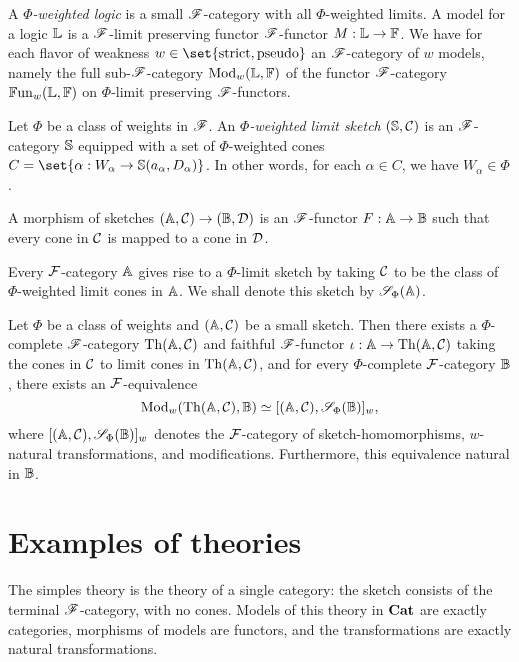 \documentclass[../thesis.tex]{subfiles}
\begin{document}
  \begin{definition}[Logic]
    A \emph{$\Phi$-weighted logic} is a small ${\mathscr{F}}$-category with all $\Phi$-weighted limits. A model for a
    logic ${\mathbb{L}}$ is a ${\mathscr{F}}$-limit preserving functor ${\mathscr{F}}$-functor $M : {\mathbb{L}} \to {\mathbb{F}}$. We have for each flavor 
    of weakness $w \in \set{\text{strict}, \text{pseudo}}$ an ${\mathscr{F}}$-category of $w$ models, namely the full
    sub-${\mathscr{F}}$-category ${\mathrm{Mod}}_w({\mathbb{L}}, {\mathbb{F}})$ of the functor ${\mathscr{F}}$-category ${\mathbb{F}\mathrm{un}}_w({\mathbb{L}},{\mathbb{F}})$ on $\Phi$-limit
    preserving ${\mathscr{F}}$-functors.
  \end{definition}

  \begin{definition}
    Let $\Phi$ be a class of weights in ${\mathscr{F}}$. An \emph{$\Phi$-weighted limit sketch} $({\mathbb{S}},{\mathcal{C}})$ is an
    ${\mathscr{F}}$-category ${\mathbb{S}}$ equipped with a set of $\Phi$-weighted cones $C = \set{\alpha : W_\alpha \to \bS(
    a_\alpha,D_\alpha)}$. In other words, for each $\alpha \in C$, we have $W_\alpha \in \Phi$.

    A morphism of sketches $({\mathbb{A}},{\mathcal{C}}) \to ({\mathbb{B}}, {\mathcal{D}})$ is an ${\mathscr{F}}$-functor $F : {\mathbb{A}} \to {\mathbb{B}}$ such that every
    cone in ${\mathcal{C}}$ is mapped to a cone in ${\mathcal{D}}$.
  \end{definition}

  Every ${\mathcal{F}}$-category ${\mathbb{A}}$ gives rise to a $\Phi$-limit sketch by taking ${\mathcal{C}}$ to be the class of
  $\Phi$-weighted limit cones in ${\mathbb{A}}$. We shall denote this sketch by ${\mathscr{S}}_\Phi({\mathbb{A}})$.
  
  \begin{theorem}
    Let $\Phi$ be a class of weights and $({\mathbb{A}},{\mathcal{C}})$ be a small sketch. Then there exists a $\Phi$-complete
    ${\mathscr{F}}$-category ${\mathrm{Th}}({\mathbb{A}},{\mathcal{C}})$ and faithful ${\mathscr{F}}$-functor $\iota : {\mathbb{A}} \to {\mathrm{Th}}({\mathbb{A}},{\mathcal{C}})$ taking the cones
    in ${\mathcal{C}}$ to limit cones in ${\mathrm{Th}}({\mathbb{A}},{\mathcal{C}})$, and for every $\Phi$-complete ${\mathcal{F}}$-category ${\mathbb{B}}$, there exists
    an ${\mathcal{F}}$-equivalence
    \[{\mathrm{Mod}}_w({\mathrm{Th}}({\mathbb{A}},{\mathcal{C}}),{\mathbb{B}}) \simeq [({\mathbb{A}},{\mathcal{C}}), {\mathscr{S}}_\Phi({\mathbb{B}})]_w,\]
    where $[({\mathbb{A}},{\mathcal{C}}), {\mathscr{S}}_\Phi({\mathbb{B}})]_w$ denotes the ${\mathcal{F}}$-category of sketch-homomorphisms, $w$-natural
    transformations, and modifications. Furthermore, this equivalence natural in ${\mathbb{B}}$.
  \end{theorem}

  \section{Examples of theories}
  \begin{example}
    The simples theory is the theory of a single category: the sketch consists of the terminal
    ${\mathscr{F}}$-category, with no cones. Models of this theory in ${\mathbf{Cat}}$ are exactly categories,
    morphisms of models are functors, and the transformations are exactly natural transformations.
  \end{example}
\end{document}

